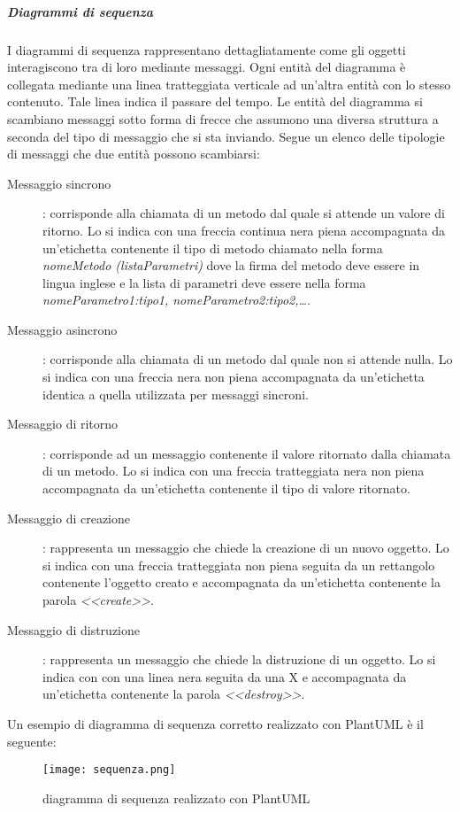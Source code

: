 \documentclass[../../norme-di-progetto.tex]{subfiles}
\begin{document}
\subparagraph{Diagrammi di sequenza}%
\label{subp:diagrammi_di_sequenza}
I diagrammi di sequenza rappresentano dettagliatamente come gli oggetti interagiscono tra di loro mediante messaggi.
Ogni entità del diagramma è collegata mediante una linea tratteggiata verticale ad un'altra entità con lo stesso contenuto.
Tale linea indica il passare del tempo.
Le entità del diagramma si scambiano messaggi sotto forma di frecce che assumono una diversa struttura a seconda del tipo di messaggio che si sta inviando.
Segue un elenco delle tipologie di messaggi che due entità possono scambiarsi:
\begin{description}
  \item [Messaggio sincrono]: corrisponde alla chiamata di un metodo dal quale si attende un valore di ritorno.
        Lo si indica con una freccia continua nera piena accompagnata da un'etichetta contenente il tipo di metodo chiamato nella forma \textit{nomeMetodo (listaParametri)} dove la firma del metodo deve essere in lingua inglese e la lista di parametri deve essere nella forma \textit{nomeParametro1:tipo1, nomeParametro2:tipo2,\ldots}.
  \item [Messaggio asincrono]: corrisponde alla chiamata di un metodo dal quale non si attende nulla.
        Lo si indica con una freccia nera non piena accompagnata da un'etichetta identica a quella utilizzata per messaggi sincroni.
  \item [Messaggio di ritorno]: corrisponde ad un messaggio contenente il valore ritornato dalla chiamata di un metodo.
        Lo si indica con una freccia tratteggiata nera non piena accompagnata da un'etichetta contenente il tipo di valore ritornato.
  \item [Messaggio di creazione]: rappresenta un messaggio che chiede la creazione di un nuovo oggetto.
        Lo si indica con una freccia tratteggiata non piena seguita da un rettangolo contenente l'oggetto creato e accompagnata da un'etichetta contenente la parola \textit{<<create>>}.
  \item [Messaggio di distruzione]: rappresenta un messaggio che chiede la distruzione di un oggetto.
        Lo si indica con con una linea nera  seguita da una X e accompagnata da un'etichetta contenente la parola \textit{<<destroy>>}.
\end{description}
Un esempio di diagramma di sequenza corretto realizzato con PlantUML è il seguente:
\begin{figure}[H]%
  \label{fig:sequenza}
  \texttt{[image: sequenza.png]}
  \centering
  \caption{diagramma di sequenza realizzato con PlantUML}
\end{figure}
\end{document}
